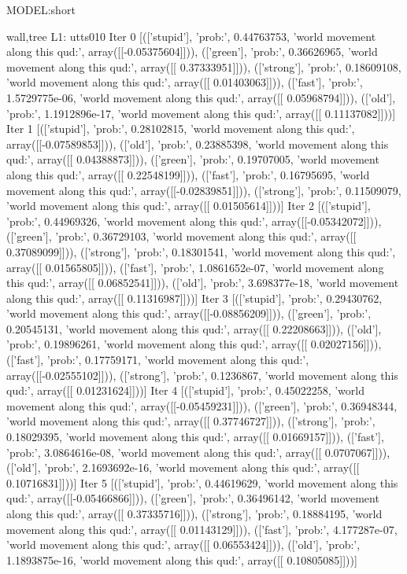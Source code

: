 

MODEL:short


wall,tree
L1: utts010
Iter 0 [(['stupid'], 'prob:', 0.44763753, 'world movement along this qud:', array([[-0.05375604]])), (['green'], 'prob:', 0.36626965, 'world movement along this qud:', array([[ 0.37333951]])), (['strong'], 'prob:', 0.18609108, 'world movement along this qud:', array([[ 0.01403063]])), (['fast'], 'prob:', 1.5729775e-06, 'world movement along this qud:', array([[ 0.05968794]])), (['old'], 'prob:', 1.1912896e-17, 'world movement along this qud:', array([[ 0.11137082]]))]
Iter 1 [(['stupid'], 'prob:', 0.28102815, 'world movement along this qud:', array([[-0.07589853]])), (['old'], 'prob:', 0.23885398, 'world movement along this qud:', array([[ 0.04388873]])), (['green'], 'prob:', 0.19707005, 'world movement along this qud:', array([[ 0.22548199]])), (['fast'], 'prob:', 0.16795695, 'world movement along this qud:', array([[-0.02839851]])), (['strong'], 'prob:', 0.11509079, 'world movement along this qud:', array([[ 0.01505614]]))]
Iter 2 [(['stupid'], 'prob:', 0.44969326, 'world movement along this qud:', array([[-0.05342072]])), (['green'], 'prob:', 0.36729103, 'world movement along this qud:', array([[ 0.37089099]])), (['strong'], 'prob:', 0.18301541, 'world movement along this qud:', array([[ 0.01565805]])), (['fast'], 'prob:', 1.0861652e-07, 'world movement along this qud:', array([[ 0.06852541]])), (['old'], 'prob:', 3.698377e-18, 'world movement along this qud:', array([[ 0.11316987]]))]
Iter 3 [(['stupid'], 'prob:', 0.29430762, 'world movement along this qud:', array([[-0.08856209]])), (['green'], 'prob:', 0.20545131, 'world movement along this qud:', array([[ 0.22208663]])), (['old'], 'prob:', 0.19896261, 'world movement along this qud:', array([[ 0.02027156]])), (['fast'], 'prob:', 0.17759171, 'world movement along this qud:', array([[-0.02555102]])), (['strong'], 'prob:', 0.1236867, 'world movement along this qud:', array([[ 0.01231624]]))]
Iter 4 [(['stupid'], 'prob:', 0.45022258, 'world movement along this qud:', array([[-0.05459231]])), (['green'], 'prob:', 0.36948344, 'world movement along this qud:', array([[ 0.37746727]])), (['strong'], 'prob:', 0.18029395, 'world movement along this qud:', array([[ 0.01669157]])), (['fast'], 'prob:', 3.0864616e-08, 'world movement along this qud:', array([[ 0.0707067]])), (['old'], 'prob:', 2.1693692e-16, 'world movement along this qud:', array([[ 0.10716831]]))]
Iter 5 [(['stupid'], 'prob:', 0.44619629, 'world movement along this qud:', array([[-0.05466866]])), (['green'], 'prob:', 0.36496142, 'world movement along this qud:', array([[ 0.37335716]])), (['strong'], 'prob:', 0.18884195, 'world movement along this qud:', array([[ 0.01143129]])), (['fast'], 'prob:', 4.177287e-07, 'world movement along this qud:', array([[ 0.06553424]])), (['old'], 'prob:', 1.1893875e-16, 'world movement along this qud:', array([[ 0.10805085]]))]
